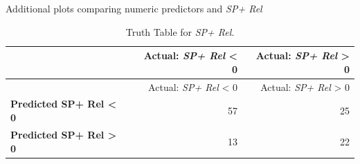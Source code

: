 \documentclass[
  12pt]{article}
\begin{document}
Additional plots comparing numeric predictors and \emph{SP+ Rel}

\begin{longtable}[]{@{}lrr@{}}
\caption{Truth Table for \emph{SP+
Rel}.}\label{tbl-truth}\tabularnewline
\toprule\noalign{}
& Actual: \emph{SP+ Rel} \textless{} 0 & Actual: \emph{SP+ Rel}
\textgreater{} 0 \\
\midrule\noalign{}
\endfirsthead
\toprule\noalign{}
& Actual: \emph{SP+ Rel} \textless{} 0 & Actual: \emph{SP+ Rel}
\textgreater{} 0 \\
\midrule\noalign{}
\endhead
\bottomrule\noalign{}
\endlastfoot
\textbf{Predicted SP+ Rel \textless{} 0} & 57 & 25 \\
\textbf{Predicted SP+ Rel \textgreater{} 0} & 13 & 22 \\
\end{longtable}



\end{document}
